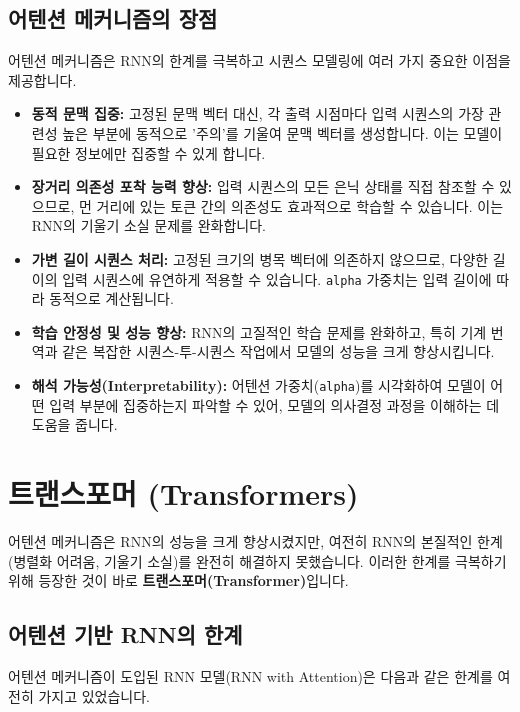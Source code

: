 \documentclass[11pt,a4paper]{article}
\theoremstyle{definition}
\begin{document}
\subsection{어텐션 메커니즘의 장점}
어텐션 메커니즘은 RNN의 한계를 극복하고 시퀀스 모델링에 여러 가지 중요한 이점을 제공합니다.

\begin{tcolorbox}[summary, title={어텐션 메커니즘의 주요 장점}]
\begin{itemize}
    \item \textbf{동적 문맥 집중:} 고정된 문맥 벡터 대신, 각 출력 시점마다 입력 시퀀스의 가장 관련성 높은 부분에 동적으로 '주의'를 기울여 문맥 벡터를 생성합니다. 이는 모델이 필요한 정보에만 집중할 수 있게 합니다.
    \item \textbf{장거리 의존성 포착 능력 향상:} 입력 시퀀스의 모든 은닉 상태를 직접 참조할 수 있으므로, 먼 거리에 있는 토큰 간의 의존성도 효과적으로 학습할 수 있습니다. 이는 RNN의 기울기 소실 문제를 완화합니다.
    \item \textbf{가변 길이 시퀀스 처리:} 고정된 크기의 병목 벡터에 의존하지 않으므로, 다양한 길이의 입력 시퀀스에 유연하게 적용할 수 있습니다. \texttt{alpha} 가중치는 입력 길이에 따라 동적으로 계산됩니다.
    \item \textbf{학습 안정성 및 성능 향상:} RNN의 고질적인 학습 문제를 완화하고, 특히 기계 번역과 같은 복잡한 시퀀스-투-시퀀스 작업에서 모델의 성능을 크게 향상시킵니다.
    \item \textbf{해석 가능성(Interpretability):} 어텐션 가중치(\texttt{alpha})를 시각화하여 모델이 어떤 입력 부분에 집중하는지 파악할 수 있어, 모델의 의사결정 과정을 이해하는 데 도움을 줍니다.
\end{itemize}
\end{tcolorbox}

\newpage
\section{트랜스포머 (Transformers)}
어텐션 메커니즘은 RNN의 성능을 크게 향상시켰지만, 여전히 RNN의 본질적인 한계(병렬화 어려움, 기울기 소실)를 완전히 해결하지 못했습니다. 이러한 한계를 극복하기 위해 등장한 것이 바로 \textbf{트랜스포머(Transformer)}입니다.

\subsection{어텐션 기반 RNN의 한계}
어텐션 메커니즘이 도입된 RNN 모델(RNN with Attention)은 다음과 같은 한계를 여전히 가지고 있었습니다.
\end{document}
